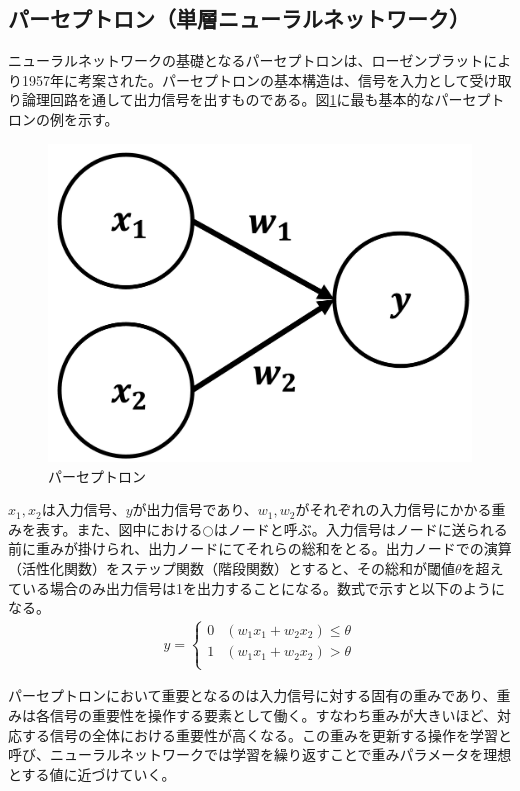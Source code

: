 \subsection{パーセプトロン（単層ニューラルネットワーク）}
ニューラルネットワークの基礎となるパーセプトロンは、ローゼンブラットにより1957年に考案された\cite{perceptron}。パーセプトロンの基本構造は、信号を入力として受け取り論理回路を通して出力信号を出すものである。図\ref{perceptron}に最も基本的なパーセプトロンの例\cite{dnnbook}を示す。
\begin{figure}[H]
	\begin{center}
 \includegraphics[keepaspectratio, scale=0.15]
 	{Figure/Deeplearning/perceptron.png}
 		\caption{パーセプトロン}
 		\label{perceptron}
	\end{center}
\end{figure}
$x_1, x_2$は入力信号、$y$が出力信号であり、$w_1,w_2$がそれぞれの入力信号にかかる重みを表す。また、図中における$\bigcirc$はノードと呼ぶ。入力信号はノードに送られる前に重みが掛けられ、出力ノードにてそれらの総和をとる。出力ノードでの演算（活性化関数）をステップ関数（階段関数）とすると、その総和が閾値$\theta$を超えている場合のみ出力信号は1を出力することになる。数式で示すと以下のようになる。
\begin{align}
 y =
 \begin{cases}
 0 & (w_1x_1 + w_2x_2 ) \leq \theta\\
 1 & (w_1x_1 + w_2x_2 ) > \theta \\
 \end{cases}
\end{align}

パーセプトロンにおいて重要となるのは入力信号に対する固有の重みであり、重みは各信号の重要性を操作する要素として働く。すなわち重みが大きいほど、対応する信号の全体における重要性が高くなる。この重みを更新する操作を学習と呼び、ニューラルネットワークでは学習を繰り返すことで重みパラメータを理想とする値に近づけていく。

